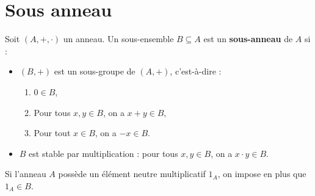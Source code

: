 \section{Sous anneau}
\begin{definition}
    Soit $(A, +, \cdot)$ un anneau. Un sous-ensemble $B \subseteq A$ est un \textbf{sous-anneau} de $A$ si :  
\begin{itemize}
    \item $(B, +)$ est un sous-groupe de $(A, +)$, c'est-à-dire :
    \begin{enumerate}
        \item $0 \in B$,
        \item Pour tous $x, y \in B$, on a $x + y \in B$,
        \item Pour tout $x \in B$, on a $-x \in B$.
    \end{enumerate}
    \item $B$ est stable par multiplication : pour tous $x, y \in B$, on a $x \cdot y \in B$.
\end{itemize}

Si l'anneau $A$ possède un élément neutre multiplicatif $1_A$, on impose en plus que $1_A \in B$.
\end{definition}


